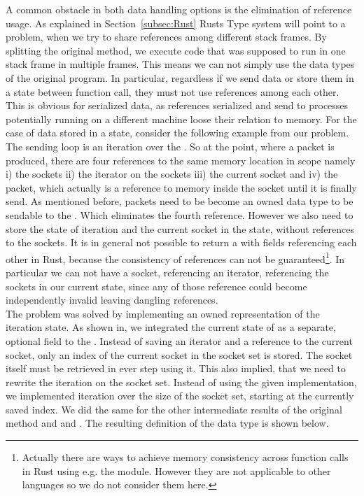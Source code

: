 A common obstacle in both data handling options is the elimination of reference usage. As explained in Section~\ref{subsec:Rust} Rusts Type system will point to a problem, when we try to share references among different stack frames. By splitting the original  method, we execute code that was supposed to run in one stack frame in multiple frames. This means we can not simply use the data types of the original program. In particular, regardless if we send data or store them in a state between function call, they must not use references among each other. This is obvious for serialized data, as references serialized and send to processes potentially running on a different machine loose their relation to memory. For the case of data stored in a state, consider the following example from our problem. The sending loop is an iteration over the . So at the point, where a packet is produced, there are four references to the same memory location in scope namely i) the sockets ii) the iterator on the sockets iii) the current socket and iv) the packet, which actually is a reference to memory inside the socket until it is finally send. As mentioned before, packets need to be become an owned data type to be sendable to the \dev{}. Which eliminates the fourth reference. However we also need to store the state of iteration and the current socket in the state, without references to the sockets. It is in general not possible to return a  with fields referencing each other in Rust, because the consistency of references can not be guaranteed\footnote{Actually there are ways to achieve memory consistency across function calls in Rust using e.g. the  module. However they are not applicable to other languages so we do not consider them here.}. In particular we can not have a socket, referencing an iterator, referencing the sockets in our current state, since any of those reference could become independently invalid leaving dangling references. \\

The problem was solved by implementing an owned representation of the iteration state. As shown in, we integrated the current state of  as a separate, optional field to the \stack{}. Instead of saving an iterator and a reference to the current socket, only an index of the current socket in the socket set is stored. The socket itself must be retrieved in ever step using it. This also implied, that we need to rewrite the iteration on the socket set. Instead of using the given  implementation, we implemented iteration over the size of the socket set, starting at the currently saved index. We did the same for the other intermediate results of the original method  and  and . The resulting definition of the \stack{} data type is shown below. 

